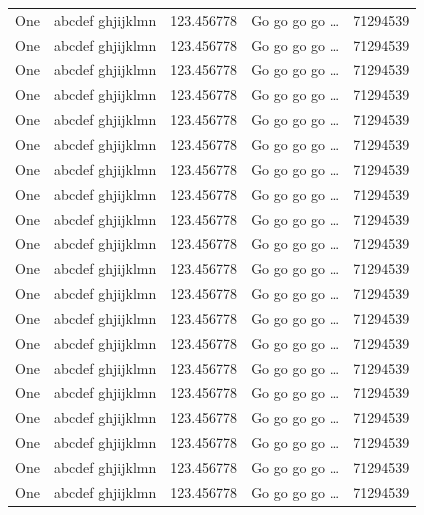 \documentclass[phd,showframe]{ndsu-thesis-2022}
\begin{document}
\begin{spacing}{0.84}
\begin{xltabular}{\textwidth}{l >{\raggedright\arraybackslash}p{0.3\textwidth} X l  >{\raggedleft\arraybackslash}X @{}}
One & abcdef ghjijklmn & 123.456778  & Go go go go \ldots & \num{71294539}\\
One & abcdef ghjijklmn & 123.456778  & Go go go go \ldots & \num{71294539}\\
One & abcdef ghjijklmn & 123.456778  & Go go go go \ldots & \num{71294539}\\
One & abcdef ghjijklmn & 123.456778  & Go go go go \ldots & \num{71294539}\\
One & abcdef ghjijklmn & 123.456778  & Go go go go \ldots & \num{71294539}\\
One & abcdef ghjijklmn & 123.456778  & Go go go go \ldots & \num{71294539}\\
One & abcdef ghjijklmn & 123.456778  & Go go go go \ldots & \num{71294539}\\
One & abcdef ghjijklmn & 123.456778  & Go go go go \ldots & \num{71294539}\\
One & abcdef ghjijklmn & 123.456778  & Go go go go \ldots & \num{71294539}\\
One & abcdef ghjijklmn & 123.456778  & Go go go go \ldots & \num{71294539}\\
One & abcdef ghjijklmn & 123.456778  & Go go go go \ldots & \num{71294539}\\
One & abcdef ghjijklmn & 123.456778  & Go go go go \ldots & \num{71294539}\\
One & abcdef ghjijklmn & 123.456778  & Go go go go \ldots & \num{71294539}\\
One & abcdef ghjijklmn & 123.456778  & Go go go go \ldots & \num{71294539}\\
One & abcdef ghjijklmn & 123.456778  & Go go go go \ldots & \num{71294539}\\
One & abcdef ghjijklmn & 123.456778  & Go go go go \ldots & \num{71294539}\\
One & abcdef ghjijklmn & 123.456778  & Go go go go \ldots & \num{71294539}\\
One & abcdef ghjijklmn & 123.456778  & Go go go go \ldots & \num{71294539}\\
One & abcdef ghjijklmn & 123.456778  & Go go go go \ldots & \num{71294539}\\
One & abcdef ghjijklmn & 123.456778  & Go go go go \ldots & \num{71294539}\\
\bottomrule
\end{xltabular}
\end{spacing}
\endgroup


\end{document}

